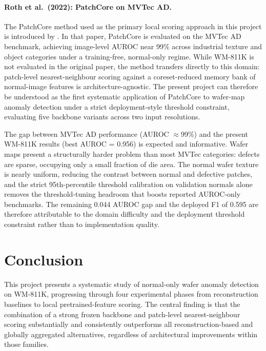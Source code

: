 \documentclass[11pt]{article}
\begin{document}
\paragraph{Roth et al.\ (2022): PatchCore on MVTec AD.}
The PatchCore method used as the primary local scoring approach in this
project is introduced by \cite{roth2022patchcore}. In that paper, PatchCore
is evaluated on the MVTec AD benchmark, achieving image-level
AUROC near 99\% across industrial texture and object categories under a
training-free, normal-only regime. While WM-811K is not evaluated in the
original paper, the method transfers directly to this domain: patch-level
nearest-neighbour scoring against a coreset-reduced memory bank of
normal-image features is architecture-agnostic. The present project can
therefore be understood as the first systematic application of PatchCore to
wafer-map anomaly detection under a strict deployment-style threshold
constraint, evaluating five backbone variants across two input resolutions.

The gap between MVTec AD performance (AUROC $\approx$99\%) and the present
WM-811K results (best AUROC = 0.956) is expected and informative. Wafer
maps present a structurally harder problem than most MVTec categories:
defects are sparse, occupying only a small fraction of die area. The normal
wafer texture is nearly uniform, reducing the contrast between normal and
defective patches, and the strict 95th-percentile threshold calibration on
validation normals alone removes the threshold-tuning headroom that
boosts reported AUROC-only benchmarks. The remaining 0.044 AUROC gap and
the deployed F1 of 0.595 are therefore attributable to the domain
difficulty and the deployment threshold constraint rather than to
implementation quality.

\section{Conclusion}

This project presents a systematic study of normal-only wafer anomaly detection on WM-811K,
progressing through four experimental phases from reconstruction baselines to local pretrained-feature scoring.
The central finding is that the combination of a strong frozen backbone and patch-level nearest-neighbour scoring
substantially and consistently outperforms all reconstruction-based and globally aggregated alternatives,
regardless of architectural improvements within those families.
\end{document}
